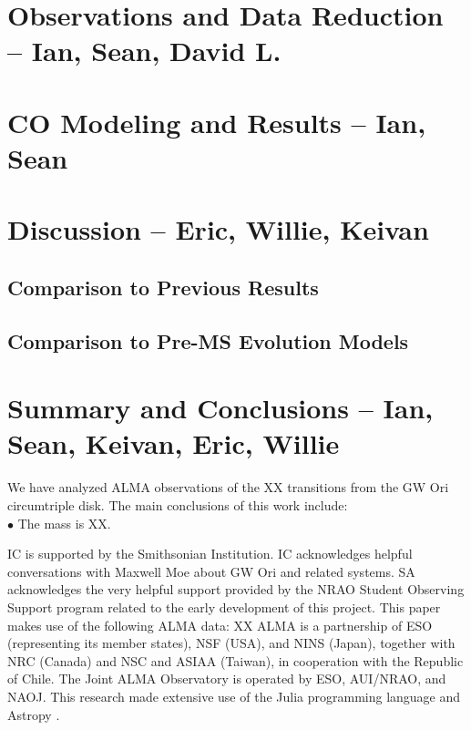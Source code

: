 \documentclass{aastex6}
\begin{document}
\section{Observations and Data Reduction -- {\bf Ian, Sean, David L.}}\label{sec:data}


\section{CO Modeling and Results -- {\bf Ian, Sean}} \label{sec:method}



\section{Discussion -- {\bf Eric, Willie, Keivan}}\label{sec:disc}



\subsection{Comparison to Previous Results}

\subsection{Comparison to Pre-MS Evolution Models}


\section{Summary and Conclusions -- {\bf Ian, Sean, Keivan, Eric, Willie}} \label{sec:summary}

We have analyzed ALMA observations of the XX transitions from the GW Ori circumtriple disk.  The main conclusions of this work include: \\

\noindent $\bullet$ The mass is XX.


\acknowledgments
IC is supported by the Smithsonian Institution. IC acknowledges helpful conversations with Maxwell Moe about GW Ori and related systems.  SA acknowledges the very helpful support provided by the NRAO Student Observing Support program related to the early development of this project.  This paper makes use of the following ALMA data: XX  ALMA is a partnership of ESO (representing its member states), NSF (USA), and NINS (Japan), together with NRC (Canada) and NSC and ASIAA (Taiwan), in cooperation with the Republic of Chile.  The Joint ALMA Observatory is operated by ESO, AUI/NRAO, and NAOJ.  This research made extensive use of the Julia programming language \citep{julia12} and Astropy \citep{astropy13}.
\end{document}
